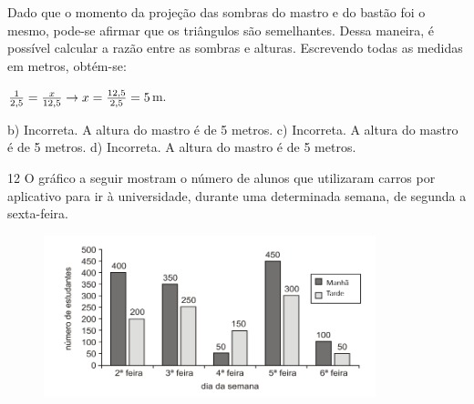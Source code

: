 \begin{escolha}
\begin{boxmedio}
\begin{boxmedio}
{\begin{boxpeq}
\begin{boxpeq}
{\begin{boxpeq}
\begin{boxmedio}
\begin{boxmedio}
\begin{boxpeq}
\begin{boxmedio}
\begin{boxpeq}
\begin{boxpeq}
\begin{boxpeq}
\begin{boxpeq}
\begin{boxmedio}
{\begin{boxmedio}
\begin{boxmedio}
\begin{boxpeq}
\begin{boxmedio}
\begin{boxpeq}
\begin{boxpeq}
\begin{boxpeq}
\begin{escolha}
{\begin{boxmedio}
\begin{boxpeq}
\begin{boxpeq}
\begin{boxpeq}
\begin{boxpeq}
\begin{boxpeq}
\begin{boxmedio}
\begin{boxpeq}
\begin{boxpeq}
\begin{boxpeq}
{\begin{boxpeq}
\begin{boxmedio}
\begin{boxpeq}
\begin{boxpeq}
\begin{boxpeq}
{\begin{boxpeq}
\begin{boxmedio}
{\begin{boxpeq}
\begin{boxpeq}
\begin{boxmedio}
\begin{boxmedio}
\begin{boxpeq}
\begin{boxpeq}
{\begin{boxpeq}
\begin{boxpeq}
\begin{boxpeq}
\begin{boxpeq}
\begin{boxpeq}
\begin{escolha}
\begin{escolha}
{\begin{boxmedio}
\begin{boxpeq}
\begin{q°}
\begin{boxmedio}
\begin{boxpeq}
\begin{boxpeq}
\begin{boxmedio}
\begin{boxmedio}
\begin{boxmedio}
\begin{boxmedio}
{{Dado que o momento da projeção das sombras do mastro e do bastão foi o
mesmo, pode-se afirmar que os triângulos são semelhantes. Dessa maneira, 
é possível calcular a razão entre as sombras e alturas.
Escrevendo todas as medidas em metros, obtém-se:

$\frac{1}{2,5} = \frac{x}{12,5} \rightarrow \\
x = \frac{12,5}{2,5} = 5$m.

b) Incorreta. A altura do mastro é de 5 metros.
c) Incorreta. A altura do mastro é de 5 metros.
d) Incorreta. A altura do mastro é de 5 metros.}

\num{12} O gráfico a seguir mostram o número de alunos que utilizaram
carros por aplicativo para ir à universidade, durante uma determinada
semana, de segunda a sexta-feira.

\begin{figure}
\centering
\includegraphics[width=3.79687in,height=1.84263in]{./_SAEB_9_MAT/media/image258.png}

\end{figure}}
\end{boxmedio}
\end{boxmedio}
\end{boxmedio}
\end{boxmedio}
\end{boxpeq}
\end{boxpeq}
\end{boxmedio}
\end{q°}
\end{boxpeq}
\end{boxmedio}}
\end{escolha}
\end{escolha}
\end{boxpeq}
\end{boxpeq}
\end{boxpeq}
\end{boxpeq}
\end{boxpeq}}
\end{boxpeq}
\end{boxpeq}
\end{boxmedio}
\end{boxmedio}
\end{boxpeq}
\end{boxpeq}}
\end{boxmedio}
\end{boxpeq}}
\end{boxpeq}
\end{boxpeq}
\end{boxpeq}
\end{boxmedio}
\end{boxpeq}}
\end{boxpeq}
\end{boxpeq}
\end{boxpeq}
\end{boxmedio}
\end{boxpeq}
\end{boxpeq}
\end{boxpeq}
\end{boxpeq}
\end{boxpeq}
\end{boxmedio}}
\end{escolha}
\end{boxpeq}
\end{boxpeq}
\end{boxpeq}
\end{boxmedio}
\end{boxpeq}
\end{boxmedio}
\end{boxmedio}}
\end{boxmedio}
\end{boxpeq}
\end{boxpeq}
\end{boxpeq}
\end{boxpeq}
\end{boxmedio}
\end{boxpeq}
\end{boxmedio}
\end{boxmedio}
\end{boxpeq}}
\end{boxpeq}
\end{boxpeq}}
\end{boxmedio}
\end{boxmedio}
\end{escolha}
